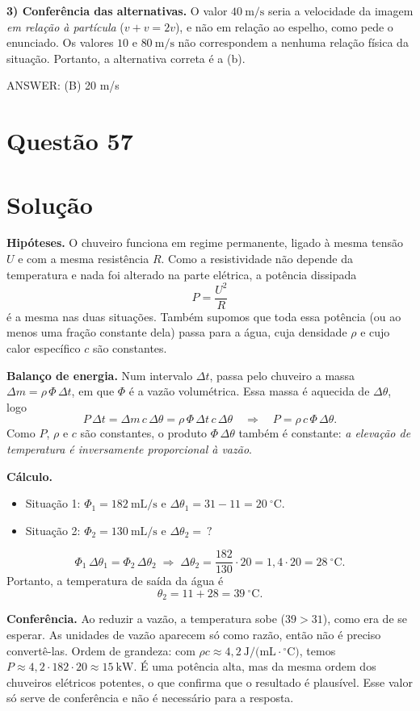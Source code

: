 \documentclass{article}%
\begin{document}
\textbf{3) Conferência das alternativas.}
O valor $40\ \text{m/s}$ seria a velocidade da imagem \emph{em relação à partícula} ($v+v=2v$), e não em relação ao espelho, como pede o enunciado. Os valores $10$ e $80\ \text{m/s}$ não correspondem a nenhuma relação física da situação. Portanto, a alternativa correta é a (b).

ANSWER: (B) 20 m/s
%
\newpage%
\section*{Questão 57}

\section*{Solução}

\textbf{Hipóteses.} O chuveiro funciona em regime permanente, ligado à mesma tensão $U$ e com a mesma resistência $R$. Como a resistividade não depende da temperatura e nada foi alterado na parte elétrica, a potência dissipada
\[
P=\frac{U^2}{R}
\]
é a mesma nas duas situações. Também supomos que toda essa potência (ou ao menos uma fração constante dela) passa para a água, cuja densidade $\rho$ e cujo calor específico $c$ são constantes.

\textbf{Balanço de energia.} Num intervalo $\Delta t$, passa pelo chuveiro a massa $\Delta m=\rho\,\Phi\,\Delta t$, em que $\Phi$ é a vazão volumétrica. Essa massa é aquecida de $\Delta\theta$, logo
\[
P\,\Delta t=\Delta m\,c\,\Delta\theta=\rho\,\Phi\,\Delta t\,c\,\Delta\theta
\quad\Longrightarrow\quad
P=\rho\,c\,\Phi\,\Delta\theta .
\]
Como $P$, $\rho$ e $c$ são constantes, o produto $\Phi\,\Delta\theta$ também é constante: \emph{a elevação de temperatura é inversamente proporcional à vazão}.

\textbf{Cálculo.}
\begin{itemize}
\item Situação 1: $\Phi_1=182\ \text{mL/s}$ e $\Delta\theta_1=31-11=20\ ^\circ\text{C}$.
\item Situação 2: $\Phi_2=130\ \text{mL/s}$ e $\Delta\theta_2=\ ?$
\end{itemize}
\[
\Phi_1\,\Delta\theta_1=\Phi_2\,\Delta\theta_2
\;\Longrightarrow\;
\Delta\theta_2=\frac{182}{130}\cdot 20=1{,}4\cdot 20=28\ ^\circ\text{C}.
\]
Portanto, a temperatura de saída da água é
\[
\theta_2=11+28=39\ ^\circ\text{C}.
\]

\textbf{Conferência.} Ao reduzir a vazão, a temperatura sobe ($39>31$), como era de se esperar. As unidades de vazão aparecem só como razão, então não é preciso convertê-las. Ordem de grandeza: com $\rho c\approx 4{,}2\ \text{J/(mL}\cdot{}^\circ\text{C)}$, temos $P\approx 4{,}2\cdot182\cdot20\approx 15\ \text{kW}$. É uma potência alta, mas da mesma ordem dos chuveiros elétricos potentes, o que confirma que o resultado é plausível. Esse valor só serve de conferência e não é necessário para a resposta.
\end{document}

